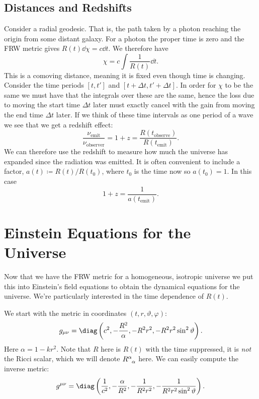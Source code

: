 \documentclass[fleqn]{NotesClass}
\begin{document}
    \subsection{Distances and Redshifts}
    Consider a radial geodesic.
    That is, the path taken by a photon reaching the origin from some distant galaxy.
    For a photon the proper time is zero and the FRW metric gives \(R(t)\dd{\chi} = c\dd{t}\).
    We therefore have
    \begin{equation}
        \chi = c \int\frac{1}{R(t)}\dd{t}.
    \end{equation}
    This is a comoving distance, meaning it is fixed even though time is changing.
    Consider the time periods \([t, t']\) and \([t + \Delta t, t' + \Delta t]\).
    In order for \(\chi\) to be the same we must have that the integrals over these are the same, hence the loss due to moving the start time \(\Delta t\) later must exactly cancel with the gain from moving the end time \(\Delta t\) later.
    If we think of these time intervals as one period of a wave we see that we get a redshift effect:
    \begin{equation}
        \frac{\nu_{\mathrm{emit}}}{\nu_{\mathrm{observer}}} = 1 + z = \frac{R(t_{\mathrm{observe}})}{R(t_{\mathrm{emit}})}.
    \end{equation}
    We can therefore use the redshift to measure how much the universe has expanded since the radiation was emitted.
    It is often convenient to include a factor, \(a(t) \coloneqq R(t)/R(t_0)\), where \(t_0\) is the time now so \(a(t_0) = 1\).
    In this case
    \begin{equation}
        1 + z = \frac{1}{a(t_{\mathrm{emit}})}.
    \end{equation}
    
    \section{Einstein Equations for the Universe}
    Now that we have the FRW metric for a homogeneous, isotropic universe we put this into Einstein's field equations to obtain the dynamical equations for the universe.
    We're particularly interested in the time dependence of \(R(t)\).
    
    We start with the metric in coordinates \((t, r, \vartheta, \varphi)\):
    \begin{equation}
        g_{\mu\nu} = \diag\left( c^2, -\frac{R^2}{\alpha}, -R^2r^2, -R^2r^2\sin^2\vartheta \right).
    \end{equation}
    Here \(\alpha = 1 - kr^2\).
    Note that \(R\) here is \(R(t)\) with the time suppressed, it is \emph{not} the Ricci scalar, which we will denote \(\tensor{R}{^\alpha_\alpha}\) here.
    We can easily compute the inverse metric:
    \begin{equation}
        g^{\mu\nu} = \diag\left( \frac{1}{c^2}, - \frac{\alpha}{R^2}, -\frac{1}{R^2r^2}, -\frac{1}{R^2r^2\sin^2\vartheta} \right).
    \end{equation}
    
\end{document}
